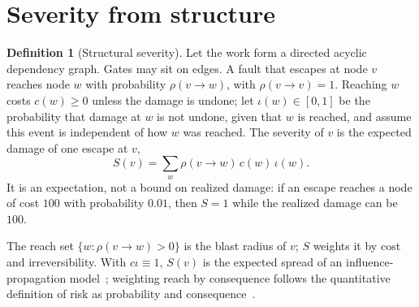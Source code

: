 \documentclass[11pt]{article}
\theoremstyle{definition}
\newtheorem{definition}[theorem]{Definition}
\theoremstyle{remark}
\begin{document}
\section{Severity from structure}\label{sec:severity}
\begin{definition}[Structural severity]\label{def:severity}
Let the work form a directed acyclic dependency graph. Gates may sit on edges. A fault that escapes
at node $v$ reaches node $w$ with probability $\rho(v\to w)$, with $\rho(v\to v)=1$. Reaching $w$ costs
$c(w)\ge0$ unless the damage is undone; let $\iota(w)\in[0,1]$ be the probability that damage at $w$ is
not undone, given that $w$ is reached, and assume this event is independent of how $w$ was reached. The
severity of $v$ is the expected damage of one escape at $v$,
\[
S(v)=\sum_{w}\rho(v\to w)\,c(w)\,\iota(w).
\]
It is an expectation, not a bound on realized damage: if an escape reaches a node of cost $100$ with
probability $0.01$, then $S=1$ while the realized damage can be $100$.
\end{definition}
The reach set $\{w:\rho(v\to w)>0\}$ is the blast radius of $v$; $S$ weights it by cost and
irreversibility. With $c\iota\equiv1$, $S(v)$ is the expected spread of an influence-propagation
model~\cite{kempe03}; weighting reach by consequence follows the quantitative definition of risk as
probability and consequence~\cite{kaplan81}.
\end{document}
